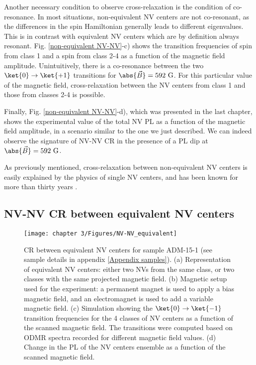 \documentclass[a4paper, 11pt]{report}
\begin{document}
Another necessary condition to observe cross-relaxation is the condition of co-resonance. In most situations, non-equivalent NV centers are not co-resonant, as the differences in the spin Hamiltonian generally leads to different eigenvalues. This is in contrast with equivalent NV centers which are by definition always resonant. Fig. \ref{non-equivalent NV-NV}-c) shows the transition frequencies of spin from class 1 and a spin from class 2-4 as a function of the magnetic field amplitude. Unintuitively, there is a co-resonance between the two $\ket{0} \to \ket{+1}$ transitions for $\abs{\vec{B}}=592\ \rm G$. For this particular value of the magnetic field, cross-relaxation between the NV centers from class 1 and those from classes 2-4 is possible.

Finally, Fig. \ref{non-equivalent NV-NV}-d), which was presented in the last chapter, shows the experimental value of the total NV PL as a function of the magnetic field amplitude, in a scenario similar to the one we just described. We can indeed observe the signature of NV-NV CR in the presence of a PL dip at $\abs{\vec{B}}=592\ \rm G$.

As previously mentioned, cross-relaxation between non-equivalent NV centers is easily explained by the physics of single NV centers, and has been known for more than thirty years \citep{holliday1989optical, van1989cross}.

\subsection{NV-NV CR between equivalent NV centers}

\begin{figure}[h]
\centering
\texttt{[image: chapter 3/Figures/NV-NV\_equivalent]}
\caption{CR between equivalent NV centers for sample ADM-15-1 (see sample details in appendix \ref{Appendix samples}). (a) Representation of equivalent NV centers: either two NVs from the same class, or two classes with the same projected magnetic field. (b) Magnetic setup used for the experiment: a permanent magnet is used to apply a bias magnetic field, and an electromagnet is used to add a variable magnetic field. (c) Simulation showing the $\ket{0}\to\ket{-1}$ transition frequencies for the 4 classes of NV centers as a function of the scanned magnetic field. The transitions were computed based on ODMR spectra recorded for different magnetic field values. (d) Change in the PL of the NV centers ensemble as a function of the scanned magnetic field.}
\label{equivalent NV-NV}
\end{figure}
\end{document}
